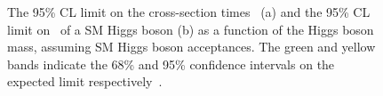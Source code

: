 \begin{figure}
  \begin{center}

 \caption{The 95\% CL limit on the cross-section times \BRinv\, (a) and the 95\% CL limit on \BRinv\, of a SM Higgs boson (b) as a function of the Higgs boson mass, assuming SM Higgs boson acceptances. The green and yellow bands indicate the 68\% and 95\% confidence intervals on the expected limit respectively~\cite{CMS-PAS-HIG-14-038}.}
    \label{fig:parkedlimits}
  \end{center}
\end{figure}

